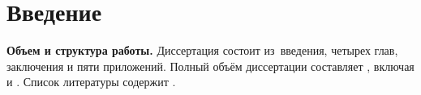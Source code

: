 \chapter*{Введение}                         %

\newcommand{\actuality}{}
\newcommand{\progress}{}
\newcommand{\aim}{{\textbf\aimTXT}}
\newcommand{\tasks}{\textbf{\tasksTXT}}
\newcommand{\novelty}{\textbf{\noveltyTXT}}
\newcommand{\influence}{\textbf{\influenceTXT}}
\newcommand{\methods}{\textbf{\methodsTXT}}
\newcommand{\defpositions}{\textbf{\defpositionsTXT}}
\newcommand{\reliability}{\textbf{\reliabilityTXT}}
\newcommand{\probation}{\textbf{\probationTXT}}
\newcommand{\contribution}{\textbf{\contributionTXT}}
\newcommand{\publications}{\textbf{\publicationsTXT}}

\textbf{Объем и структура работы.} Диссертация состоит из~введения,
четырех глав, %
заключения и
пяти приложений. %
%
Полный объём диссертации составляет
, включая
 и
.
Список литературы содержит
.
